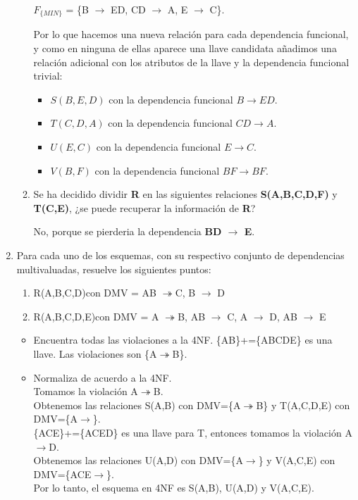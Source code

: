 \documentclass[a4paper, 12pt]{report}
\begin{document}
\begin{enumerate}
\begin{enumerate}
    $F_{\{MIN\}}$ = \{B $\rightarrow$ ED, CD $\rightarrow$ A, E $\rightarrow$ C\}.
  
  Por lo que hacemos una nueva relación para cada dependencia
  funcional, y como en ninguna de ellas aparece una llave candidata
   añadimos una relación
  adicional con los atributos de la llave y la dependencia funcional
  trivial:
  \begin{itemize}
    \item $S(B, E, D)$ con la dependencia funcional $B \to ED$.

    \item $T(C, D, A)$ con la dependencia funcional $CD \to A$.

    \item $U(E, C)$ con la dependencia funcional $E \to C$.

    \item $V(B, F)$ con la dependencia funcional $BF \to BF$.
  \end{itemize}
	\item Se ha decidido dividir \textbf{R} en las siguientes relaciones \textbf{S(A,B,C,D,F)} y \textbf{T(C,E)}, ¿se puede recuperar la información de \textbf{R}? 
	
	 No, porque se pierderia la dependencia \textbf{BD $\rightarrow$ E}.

\end{enumerate}
\item Para  cada  uno  de  los  esquemas,  con  su  respectivo  conjunto  de  dependencias  multivaluadas, resuelve los siguientes puntos:\\
\begin{enumerate}
	\item R(A,B,C,D)con DMV = {AB $\twoheadrightarrow$C, B $\rightarrow$ D}
	\item R(A,B,C,D,E)con DMV = { A $\twoheadrightarrow$B, AB $\rightarrow$ C, A $\rightarrow$ D, AB $\rightarrow$ E}\\
\end{enumerate}
\begin{itemize}
	\item Encuentra todas las violaciones a la 4NF.
	\{AB\}+=\{ABCDE\} es una llave. Las violaciones son \{A$\twoheadrightarrow$B\}.\\
	\item Normaliza de acuerdo a la 4NF.\\
	Tomamos la violación A$\twoheadrightarrow$B.\\
	Obtenemos las relaciones S(A,B) con DMV=\{A$\twoheadrightarrow$B\} y
	T(A,C,D,E) con DMV=\{A$\rightarrow$\}.\\
	\{ACE\}+=\{ACED\} es una llave para T, entonces tomamos la violación
	A$\rightarrow$D.\\
	Obtenemos las relaciones U(A,D) con DMV=\{A$\rightarrow$\} y V(A,C,E) con
	DMV=\{ACE$\rightarrow$\}.\\
	Por lo tanto, el esquema en 4NF es S(A,B), U(A,D) y V(A,C,E).
	

\end{itemize}
\end{enumerate}
\end{document}
